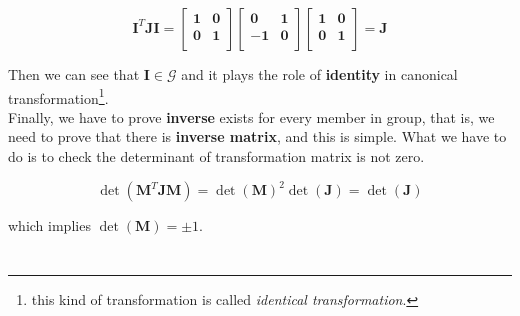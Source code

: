\documentclass[12pt]{article}
\numberwithin{equation}{section}
\begin{document}
\[
    \mathbf{I}^T\mathbf{JI} = \begin{bmatrix}
        \mathbf{1}&\mathbf{0}\\
        \mathbf{0}&\mathbf{1}\\
    \end{bmatrix}
    \begin{bmatrix}
        \mathbf{0}&\mathbf{1}\\
        \mathbf{-1}&\mathbf{0}\\
    \end{bmatrix}
    \begin{bmatrix}
        \mathbf{1}&\mathbf{0}\\
        \mathbf{0}&\mathbf{1}\\
    \end{bmatrix}
    = \mathbf{J}
\]

Then we can see that $\mathbf{I} \in \mathcal{G}$ and it plays the role of \textbf{identity} in canonical transformation\footnote{this kind of transformation is called \textit{identical transformation}.}.
\\
\indent Finally, we have to prove \textbf{inverse} exists for every member in group, that is, we need to prove that there is \textbf{inverse matrix}, and this is simple. What we have to do is to check the determinant of transformation matrix is not zero. 

\begin{equation}
    \det(\mathbf{M}^T\mathbf{JM}) = \det(\mathbf{M})^2\det(\mathbf{J}) = \det(\mathbf{J}) 
\end{equation}

which implies $\det(\mathbf{M}) = \pm 1$.

\section{}
\end{document}
